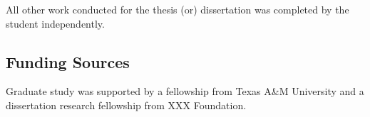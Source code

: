 All other work conducted for the thesis (or) dissertation was completed by the student independently.
\subsection*{Funding Sources}
Graduate study was supported by a fellowship from Texas A\&M University and a dissertation research fellowship from XXX Foundation. 
\pagebreak{}
